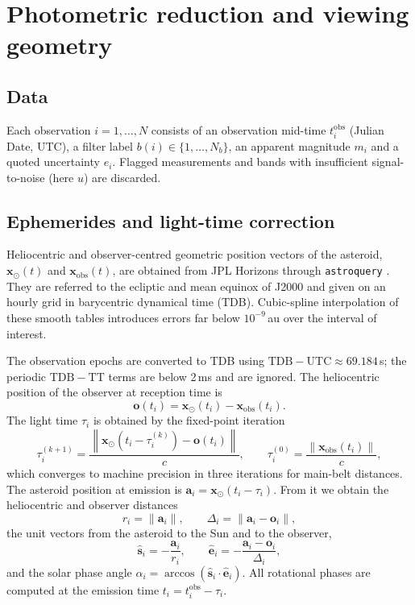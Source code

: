 \documentclass[11pt,a4paper]{article}
\theoremstyle{remark}
\newcommand{\vect}[1]{\bm{#1}}
\newcommand{\uv}[1]{\hat{\bm{#1}}}
\begin{document}
\section{Photometric reduction and viewing geometry}
\label{sec:geometry}

\subsection{Data}
Each observation $i=1,\dots,N$ consists of an observation mid-time $t_i^{\mathrm{obs}}$ (Julian Date,
UTC), a filter label $b(i)\in\{1,\dots,N_b\}$, an apparent magnitude $m_i$ and a quoted
uncertainty $e_i$. Flagged measurements and bands with insufficient signal-to-noise (here $u$) are
discarded.

\subsection{Ephemerides and light-time correction}
\label{sec:ephem}
Heliocentric and observer-centred geometric position vectors of the asteroid,
$\vect{x}_\odot(t)$ and $\vect{x}_{\mathrm{obs}}(t)$, are obtained from JPL Horizons
\citep{giorgini1996} through \texttt{astroquery} \citep{ginsburg2019}. They are referred to the
ecliptic and mean equinox of J2000 and given on an hourly grid in barycentric dynamical time (TDB).
Cubic-spline interpolation of these smooth tables introduces errors far below $10^{-9}$\,au over the
interval of interest.

The observation epochs are converted to TDB using $\mathrm{TDB}-\mathrm{UTC}\approx 69.184$\,s; the
periodic $\mathrm{TDB}-\mathrm{TT}$ terms are below 2\,ms and are ignored. The heliocentric position of
the observer at reception time is
\begin{equation}
  \vect{o}(t_i) = \vect{x}_\odot(t_i) - \vect{x}_{\mathrm{obs}}(t_i).
\end{equation}
The light time $\tau_i$ is obtained by the fixed-point iteration
\begin{equation}
  \tau_i^{(k+1)} = \frac{\left\lVert \vect{x}_\odot(t_i-\tau_i^{(k)}) - \vect{o}(t_i)\right\rVert}{c},
  \qquad \tau_i^{(0)} = \frac{\lVert\vect{x}_{\mathrm{obs}}(t_i)\rVert}{c},
  \label{eq:lighttime}
\end{equation}
which converges to machine precision in three iterations for main-belt distances. The asteroid
position at emission is $\vect{a}_i=\vect{x}_\odot(t_i-\tau_i)$. From it we obtain the heliocentric
and observer distances
\begin{equation}
  r_i=\lVert\vect{a}_i\rVert, \qquad \Delta_i=\lVert\vect{a}_i-\vect{o}_i\rVert,
\end{equation}
the unit vectors from the asteroid to the Sun and to the observer,
\begin{equation}
  \uv{s}_i=-\frac{\vect{a}_i}{r_i},\qquad \uv{e}_i=-\frac{\vect{a}_i-\vect{o}_i}{\Delta_i},
  \label{eq:unitvectors}
\end{equation}
and the solar phase angle $\alpha_i=\arccos(\uv{s}_i\cdot\uv{e}_i)$. All rotational phases are
computed at the emission time $t_i=t_i^{\mathrm{obs}}-\tau_i$.
\end{document}
